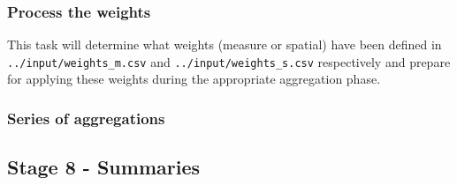 \documentclass[
  8pt,
  a4paper]{article}
\begin{document}
\subsubsection{Process the weights}\label{process-the-weights}

This task will determine what weights (measure or spatial) have been
defined in \texttt{../input/weights\_m.csv} and
\texttt{../input/weights\_s.csv} respectively and prepare for applying
these weights during the appropriate aggregation phase.

\subsubsection{Series of aggregations}\label{series-of-aggregations}

\subsection{Stage 8 - Summaries}\label{stage-8---summaries}
\end{document}
